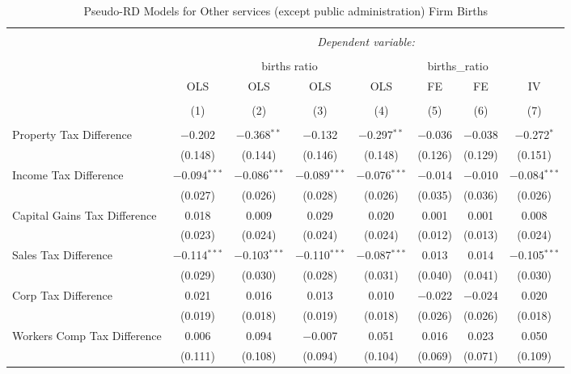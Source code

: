 
\begin{table}[!htbp] \centering 
  \caption{Pseudo-RD Models for  Other services (except public administration) Firm Births} 
  \label{} 
\begin{tabular}{@{\extracolsep{5pt}}lccccccc} 
\\[-1.8ex]\hline 
\hline \\[-1.8ex] 
 & \multicolumn{7}{c}{\textit{Dependent variable:}} \\ 
\cline{2-8} 
\\[-1.8ex] & \multicolumn{4}{c}{births ratio} & \multicolumn{2}{c}{births\_ratio} &   \\ 
 & OLS & OLS & OLS & OLS & FE & FE & IV \\ 
\\[-1.8ex] & (1) & (2) & (3) & (4) & (5) & (6) & (7)\\ 
\hline \\[-1.8ex] 
 Property Tax Difference & $-$0.202 & $-$0.368$^{**}$ & $-$0.132 & $-$0.297$^{**}$ & $-$0.036 & $-$0.038 & $-$0.272$^{*}$ \\ 
  & (0.148) & (0.144) & (0.146) & (0.148) & (0.126) & (0.129) & (0.151) \\ 
  Income Tax Difference & $-$0.094$^{***}$ & $-$0.086$^{***}$ & $-$0.089$^{***}$ & $-$0.076$^{***}$ & $-$0.014 & $-$0.010 & $-$0.084$^{***}$ \\ 
  & (0.027) & (0.026) & (0.028) & (0.026) & (0.035) & (0.036) & (0.026) \\ 
  Capital Gains Tax Difference & 0.018 & 0.009 & 0.029 & 0.020 & 0.001 & 0.001 & 0.008 \\ 
  & (0.023) & (0.024) & (0.024) & (0.024) & (0.012) & (0.013) & (0.024) \\ 
  Sales Tax Difference & $-$0.114$^{***}$ & $-$0.103$^{***}$ & $-$0.110$^{***}$ & $-$0.087$^{***}$ & 0.013 & 0.014 & $-$0.105$^{***}$ \\ 
  & (0.029) & (0.030) & (0.028) & (0.031) & (0.040) & (0.041) & (0.030) \\ 
  Corp Tax Difference & 0.021 & 0.016 & 0.013 & 0.010 & $-$0.022 & $-$0.024 & 0.020 \\ 
  & (0.019) & (0.018) & (0.019) & (0.018) & (0.026) & (0.026) & (0.018) \\ 
  Workers Comp Tax Difference & 0.006 & 0.094 & $-$0.007 & 0.051 & 0.016 & 0.023 & 0.050 \\ 
  & (0.111) & (0.108) & (0.094) & (0.104) & (0.069) & (0.071) & (0.109) \\ 

\end{tabular}
\end{table}

